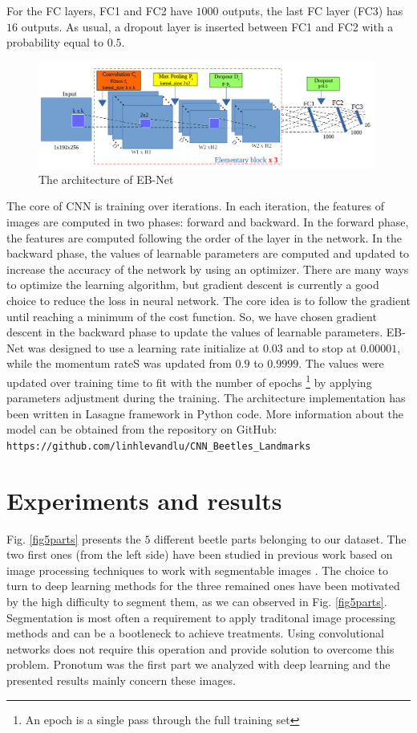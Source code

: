 \documentclass[review]{elsarticle}
\begin{document}
For the FC layers, FC1 and FC2 have $1000$ outputs, the last FC layer (FC3) has $16$ outputs. As usual, a dropout layer is inserted between FC1 and FC2 with a probability equal to $0.5$.

\begin{figure}[h]
	\centering
	\includegraphics[width=0.99\textwidth]{images/model3}
	\caption{The architecture of EB-Net}
	\label{fignet3}
\end{figure}

The core of CNN is training over iterations. In each iteration, the features of images are computed in two phases: forward and backward. In the forward phase, the features are computed following the order of the layer in the network. In the backward phase, the values of learnable parameters are computed and updated to increase the accuracy of the network by using an optimizer. There are many ways to
optimize the learning algorithm, but gradient descent
\cite{lecun2012efficient} is currently a good choice to reduce the
loss in neural network. The core idea is to follow the gradient until
reaching a minimum of the cost function. So, we have chosen gradient
descent in the backward phase to update the values of learnable
parameters. EB-Net was designed to use a learning rate initialize at
$0.03$ and to stop at $0.00001$, while the momentum rateS was updated from
$0.9$ to $0.9999$. The values were updated over training time to fit
with the number of epochs \footnote{An epoch is a single pass through
  the full training set} by applying parameters adjustment during the
training. The architecture implementation has been written in Lasagne
framework \cite{lasagne} in Python code. More information about the
model can be obtained from the repository on GitHub:
\texttt{https://github.com/linhlevandlu/CNN\_Beetles\_Landmarks}

\section{Experiments and results}
\label{sexperiments}
Fig. \ref{fig5parts} presents the $5$ different beetle parts belonging
to our dataset. The two first ones (from the left side) have been
studied in previous work based on image processing techniques
to work with segmentable images \cite{le2017maelab}. The choice to
turn to deep learning methods for the three remained ones have
been motivated by the high difficulty to segment them, as we can
observed in Fig. \ref{fig5parts}. Segmentation is most often a
requirement to apply traditonal image processing methods and can be a
bootleneck to achieve treatments. Using convolutional networks does not
require this operation and provide solution to overcome this
problem. Pronotum was the first part we analyzed with deep learning and the presented results mainly concern
these images.
\end{document}
